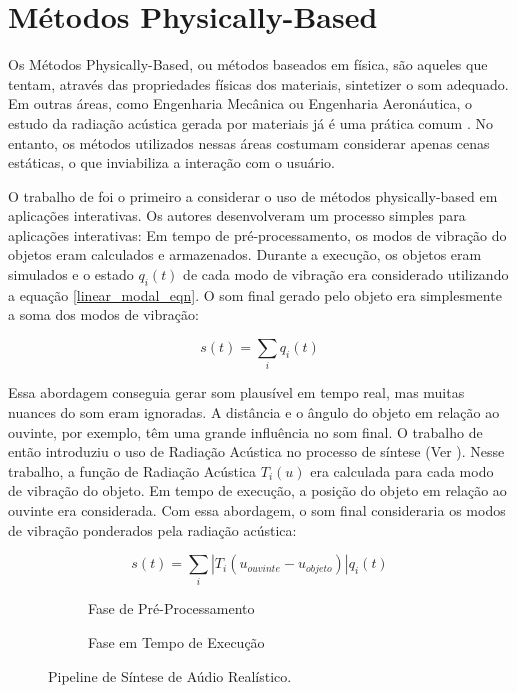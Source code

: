 \section{Métodos Physically-Based}

Os Métodos Physically-Based, ou métodos baseados em física, são aqueles que tentam, através das propriedades físicas dos materiais, sintetizer o som adequado. Em outras áreas, como Engenharia Mecânica ou Engenharia Aeronáutica, o estudo da radiação acústica gerada por materiais já é uma prática comum \cite{pierce1981acoustics}. No entanto, os métodos utilizados nessas áreas costumam considerar apenas cenas estáticas, o que inviabiliza a interação com o usuário.

O trabalho de \cite{van2001foleyautomatic} foi o primeiro a considerar o uso de métodos physically-based em aplicações interativas. Os autores desenvolveram um processo simples para aplicações interativas: Em tempo de pré-processamento, os modos de vibração do objetos eram calculados e armazenados. Durante a execução, os objetos eram simulados e o estado $q_i(t)$ de cada modo de vibração era considerado utilizando a equação \eqref{linear_modal_eqn}. O som final gerado pelo objeto era simplesmente a soma dos modos de vibração:

\begin{equation}
	s(t) = \sum_i q_i(t)
\end{equation}

Essa abordagem conseguia gerar som plausível em tempo real, mas muitas nuances do som eram ignoradas. A distância e o ângulo do objeto em relação ao ouvinte, por exemplo, têm uma grande influência no som final. O trabalho de \cite{james2006precomputed} então introduziu o uso de Radiação Acústica no processo de síntese (Ver ). Nesse trabalho, a função de Radiação Acústica $T_i(u)$ era calculada para cada modo de vibração do objeto. Em tempo de execução, a posição do objeto em relação ao ouvinte era considerada. Com essa abordagem, o som final consideraria os modos de vibração ponderados pela radiação acústica: 

\begin{equation}
	s(t) = \sum_i |T_i(u_{ouvinte}-u_{objeto})| q_i(t)
\end{equation}

\begin{figure}[ht]
\begin{subfigure}{\textwidth}
	\centering
	
	\caption{Fase de Pré-Processamento}\label{pipeline_offline}
\end{subfigure}
\begin{subfigure}{\textwidth}
	\centering
	
	\caption{Fase em Tempo de Execução}\label{pipeline_online}
\end{subfigure}
\caption[Pipeline de Síntese de Aúdio Realístico]{Pipeline de Síntese de Aúdio Realístico.}
\label{fig:pipeline_overview}
\end{figure}

